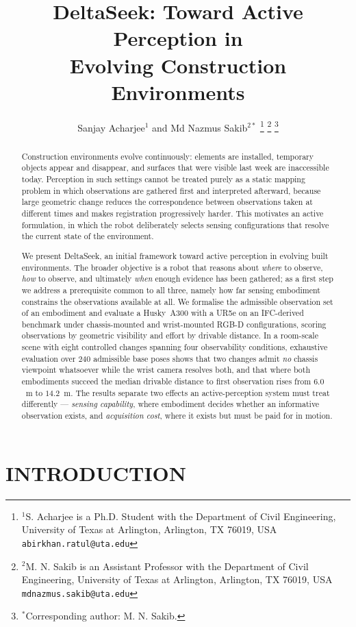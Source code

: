 \documentclass[letterpaper, 10 pt, conference]{ieeeconf}
\title{\LARGE \bf
DeltaSeek: Toward Active Perception in\\Evolving Construction Environments
}
\author{Sanjay Acharjee$^{1}$ and Md Nazmus Sakib$^{2*}$%
\thanks{$^{1}$S. Acharjee is a Ph.D. Student with the Department of Civil
Engineering, University of Texas at Arlington, Arlington, TX 76019, USA
{\tt\small abirkhan.ratul@uta.edu}}%
\thanks{$^{2}$M. N. Sakib is an Assistant Professor with the Department of
Civil Engineering, University of Texas at Arlington, Arlington, TX 76019, USA
{\tt\small mdnazmus.sakib@uta.edu}}%
\thanks{$^{*}$Corresponding author: M. N. Sakib.}%
}
\begin{document}
\maketitle
\thispagestyle{empty}
\pagestyle{empty}

\begin{abstract}
Construction environments evolve continuously: elements are installed,
temporary objects appear and disappear, and surfaces that were visible last
week are inaccessible today. Perception in such settings cannot be treated
purely as a static mapping problem in which observations are gathered first and
interpreted afterward, because large geometric change reduces the
correspondence between observations taken at different times and makes
registration progressively harder. This motivates an active formulation, in
which the robot deliberately selects sensing configurations that resolve the
current state of the environment.

We present DeltaSeek, an initial framework toward active perception in evolving
built environments. The broader objective is a robot that reasons about
\emph{where} to observe, \emph{how} to observe, and ultimately \emph{when}
enough evidence has been gathered; as a first step we address a prerequisite
common to all three, namely how far sensing embodiment constrains the
observations available at all. We formalise the admissible observation set of
an embodiment and evaluate a Husky~A300 with a UR5e on an IFC-derived benchmark
under chassis-mounted and wrist-mounted RGB-D configurations, scoring
observations by geometric visibility and effort by drivable distance. In a
room-scale scene with eight controlled changes spanning four observability
conditions, exhaustive evaluation over $240$ admissible base poses shows that
two changes admit \emph{no} chassis viewpoint whatsoever while the wrist camera
resolves both, and that where both embodiments succeed the median drivable
distance to first observation rises from $6.0$~m to $14.2$~m. The results
separate two effects an active-perception system must treat differently ---
\emph{sensing capability}, where embodiment decides whether an informative
observation exists, and \emph{acquisition cost}, where it exists but must be
paid for in motion.
\end{abstract}

\section{INTRODUCTION}
\end{document}
